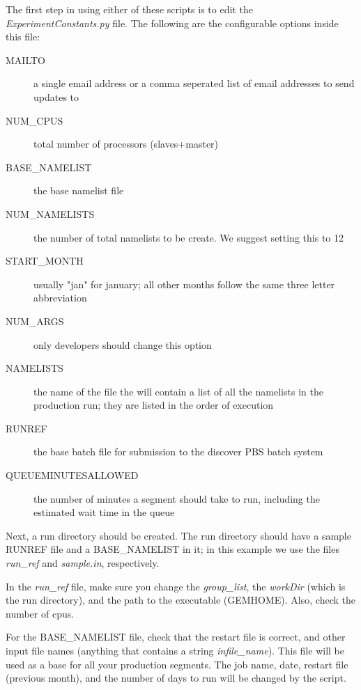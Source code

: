 The first step in using either of these scripts is to edit the 
{\em ExperimentConstants.py} file.  The following are the configurable options
inside this file:
\begin{description}
\item[MAILTO] a single email address or a comma seperated list of email addresses to send updates to \\
\item[NUM\_CPUS] total number of processors (slaves+master) \\
\item[BASE\_NAMELIST] the base namelist file \\
\item[NUM\_NAMELISTS] the number of total namelists to be create. We suggest setting this to 12 \\
\item[START\_MONTH] usually "jan" for january; all other months follow the same three letter abbreviation \\
\item[NUM\_ARGS] only developers should change this option
\item[NAMELISTS] the name of the file the will contain a list of all the namelists in the production run; 
  they are listed in the order of execution \\
\item[RUNREF] the base batch file for submission to the discover PBS batch system \\
\item[QUEUEMINUTESALLOWED] the number of minutes a segment should take to run, 
   including the estimated wait time in the queue
\end{description}

Next, a run directory should be created.  The run directory should have a sample RUNREF file and a
BASE\_NAMELIST in it; in this example we use the files {\em run\_ref} and {\em sample.in}, respectively.

In the {\em run\_ref} file, make sure you change the {\em group\_list}, the {\em workDir} (which is the run directory), 
and the path to the executable (GEMHOME).  Also, check the number of cpus.

For the BASE\_NAMELIST file, check that the restart file is correct, and other input file names (anything that contains a string {\em infile\_name}).
This file will be used as a base for all your production segments. The job name, date, restart file (previous month), and the number of days to run will be
changed by the script. 

